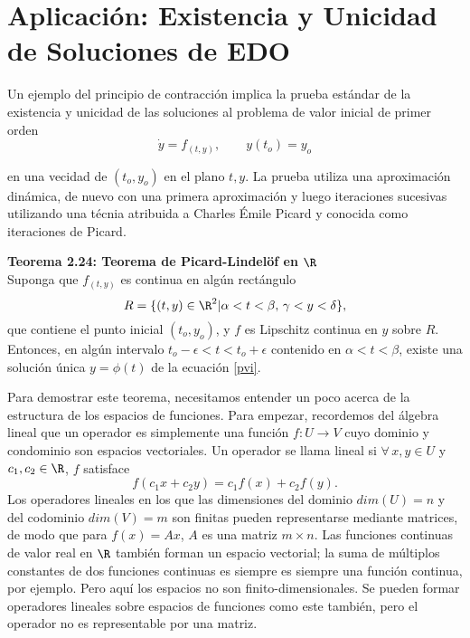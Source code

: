 
\section*{Aplicación: Existencia y Unicidad de Soluciones de EDO}

Un ejemplo del principio de contracción implica la prueba estándar de la existencia y unicidad de las soluciones al problema de valor inicial de primer orden
	\begin{equation}
		\dot{y} = f_{(t,y)}, \qquad y(t_o) = y_o \label{pvi}
	\end{equation}


en una vecidad de $(t_o,y_o)$ en el plano $t,y$. La prueba utiliza una aproximación dinámica, de nuevo con una primera aproximación y luego iteraciones sucesivas utilizando una técnia atribuida a Charles Émile Picard y conocida como iteraciones de Picard.




\begin{mdframed}[style=warning]
	\begin{tcolorbox}[arc=0mm,boxrule=0pt,colframe=white,colback=lightgray!25]
		{\large \textbf{Teorema 2.24: Teorema de Picard-Lindelöf en $\mathbf{\R}$}} \\
		Suponga que $f_{(t,y)}$ es continua en algún rectángulo
			$$ R = \{ (t,y) \in \R ^2 | \alpha < t < \beta ,\, \gamma < y < \delta \} , $$
		que contiene el punto inicial $(t_o ,y_o)$, y $f$ es Lipschitz continua en $y$ sobre $R$. Entonces, en algún intervalo $t_o - \epsilon < t < t_o + \epsilon$ contenido en $\alpha < t < \beta$, existe una solución única $y = \phi (t)$ de la ecuación \eqref{pvi}.
	\end{tcolorbox}
\end{mdframed}

Para demostrar este teorema, necesitamos entender un poco acerca de la estructura de los espacios de funciones. Para empezar, recordemos del álgebra lineal que un operador es simplemente una función $f:U\to V$ cuyo dominio y condominio son espacios vectoriales. Un operador se llama lineal si $\forall \, x,y \in U$ y $c_1, c_2 \in \R$, $f$ satisface
	$$ f(c_1 x + c_2 y) = c_1 f(x) + c_2 f(y). $$
Los operadores lineales en los que las dimensiones del dominio $dim(U) = n$ y del codominio $dim(V) = m$ son finitas pueden representarse mediante matrices, de modo que para $f(x) = Ax$, $A$ es una matriz $m\times n$. Las funciones continuas de valor real en $\R$ también forman un espacio vectorial; la suma de múltiplos constantes de dos funciones continuas es siempre es siempre una función continua, por ejemplo. Pero aquí los espacios no son finito-dimensionales. Se pueden formar operadores lineales sobre espacios de funciones como este también, pero el operador no es representable por una matriz. \\


